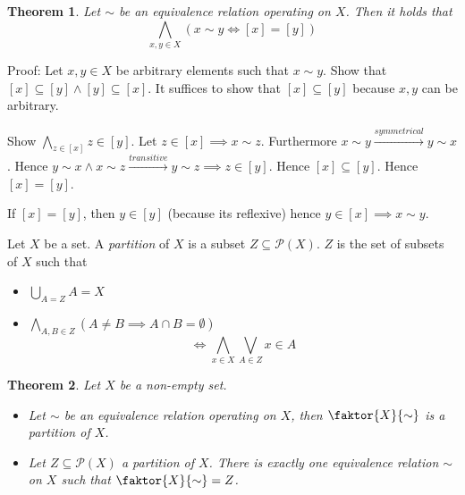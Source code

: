\documentclass[a4paper,landscape,twocolumn]{article}
\newtheorem{theorem}{Theorem}
\begin{document}
\begin{theorem}
  \label{satz-1.2.9}
  Let $\sim$ be an equivalence relation operating on $X$.
  Then it holds that
  \[ \bigwedge_{x,y \in X} \left(x \sim y \iff [x] = [y]\right) \]
\end{theorem}

Proof:
Let $x,y \in X$ be arbitrary elements such that $x \sim y$.
Show that $[x] \subseteq [y] \land [y] \subseteq [x]$.
It suffices to show that $[x] \subseteq [y]$ because $x,y$ can be arbitrary.

Show $\bigwedge_{z \in [x]} z \in [y]$.
Let $z \in [x] \implies x \sim z$. Furthermore $x \sim y \xrightarrow{symmetrical} y \sim x$.
Hence $y \sim x \land x \sim z \xrightarrow{transitive} y \sim z \implies z \in [y]$.
Hence $[x] \subseteq [y]$. Hence $[x] = [y]$.

If $[x] = [y]$, then $y \in [y]$ (because its reflexive) hence $y \in [x] \implies x \sim y$.

Let $X$ be a set. A \emph{partition} of $X$ is a subset $Z \subseteq \mathcal{P}(X)$.
$Z$ is the set of subsets of $X$ such that

\begin{itemize}
  \item $\bigcup_{A = Z} A = X$
  \item $\bigwedge_{A,B \in Z} \left(A \neq B \implies A \cap B = \emptyset\right)$
    \[ \iff \bigwedge_{x \in X} \bigvee_{A \in Z} x \in A \]
\end{itemize}

\begin{theorem}
  Let $X$ be a non-empty set.
  \begin{itemize}
    \item
      Let $\sim$ be an equivalence relation operating on $X$,
      then $\faktor{X}{\sim}$ is a partition of $X$.
    \item
      Let $Z \subseteq \mathcal{P}(X)$ a partition of $X$.
      There is exactly one equivalence relation $\sim$ on $X$
      such that $\faktor{X}{\sim} = Z$.
  \end{itemize}
\end{theorem}
\end{document}

